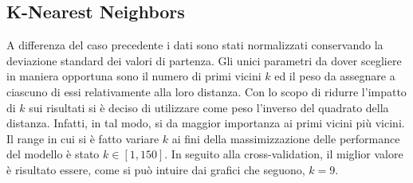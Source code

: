 \documentclass[a4paper,9pt]{article}
\begin{document}
\subsection{K-Nearest Neighbors}
A differenza del caso precedente i dati sono stati normalizzati conservando la deviazione standard dei valori di partenza.
Gli unici parametri da dover scegliere in maniera opportuna sono il numero di primi vicini $k$ ed il peso da assegnare a ciascuno di essi relativamente alla loro distanza. Con lo scopo di ridurre l'impatto di $k$ sui risultati si è deciso di utilizzare come peso l'inverso del quadrato della distanza. Infatti, in tal modo, si da maggior importanza ai primi vicini più vicini.
Il range in cui si è fatto variare $k$ ai fini della massimizzazione delle performance del modello è stato $k \in [1,150]$. In seguito alla cross-validation, il miglior valore è risultato essere, come si può intuire dai grafici che seguono, $k=9$.
\end{document}
